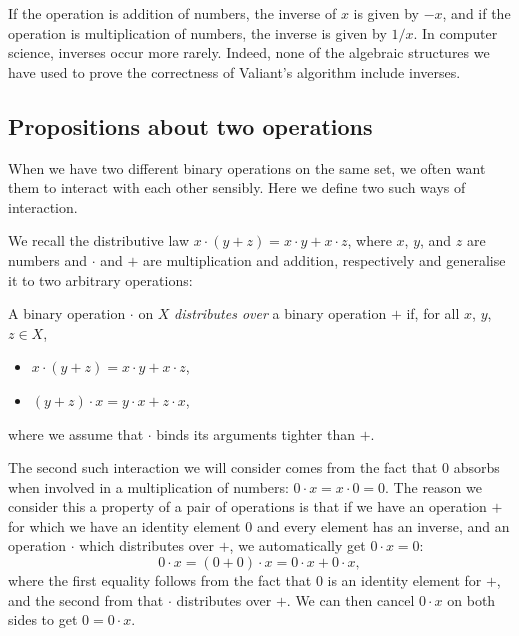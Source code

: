 If the operation is addition of numbers, the inverse of $x$ is given by $-x$, and if the operation is multiplication of numbers, the inverse is given by $1/x$. In computer science, inverses occur more rarely.
Indeed, none of the algebraic structures we have used to prove the correctness of Valiant's algorithm include inverses.

\subsection{Propositions about two operations}
\label{two-operations}
When we have two different binary operations on the same set, we often want them to interact with each other sensibly. Here we define two such ways of interaction.

We recall the distributive law $x\cdot(y + z) = x\cdot y + x\cdot z$, where $x$, $y$, and $z$ are numbers and $\cdot$ and $+$ are multiplication and addition, respectively and generalise it to two arbitrary operations:
\begin{Definition}
  A binary operation $\cdot$ on $X$ \emph{distributes over} a binary operation $+$ if, for all $x$, $y$, $z \in X$,
  \begin{itemize}
  \item $x \cdot (y + z) = x \cdot y + x \cdot z$,
  \item $(y + z) \cdot x = y \cdot x + z \cdot x$,
  \end{itemize}
  where we assume that $\cdot$ binds its arguments tighter than $+$.
\end{Definition}

\label{zero-element}
The second such interaction we will consider comes from the fact that $0$ absorbs when involved in a multiplication of numbers: $0 \cdot x = x \cdot 0 = 0$. The reason we consider this a property of a pair of operations is that if we have an operation $+$ for which we have an identity element $0$ and every element has an inverse, and an operation $\cdot$ which distributes over $+$, we automatically get $0 \cdot x = 0$:
\begin{equation*}
  0 \cdot x = (0 + 0) \cdot x = 0 \cdot x + 0 \cdot x,
\end{equation*}
where the first equality follows from the fact that $0$ is an identity element for $+$, and the second from that $\cdot$ distributes over $+$. We can then cancel $0 \cdot x$ on both sides to get $0 = 0 \cdot x$.

